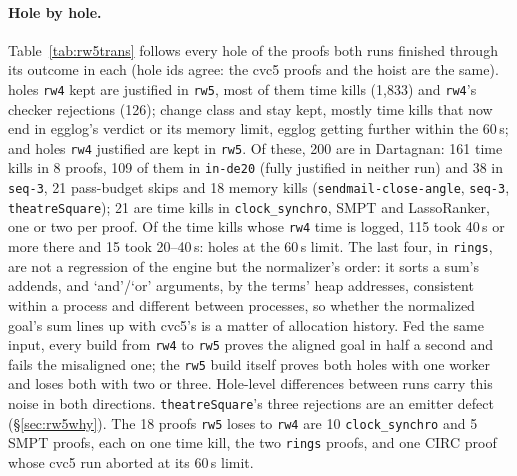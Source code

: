 \documentclass[11pt,a4paper]{article}
\newcommand{\code}[1]{\texttt{#1}}
\begin{document}
\paragraph{Hole by hole.} Table~\ref{tab:rw5trans} follows every hole of
the proofs both runs finished through its outcome in each (hole ids agree:
the cvc5 proofs and the hoist are the same). \rwfivegains{} holes
\code{rw4} kept are justified in \code{rw5}, most of them time kills
(1,833) and \code{rw4}'s checker rejections (126); \rwfiveshifts{} change
class and stay kept, mostly time kills that now end in egglog's verdict or
its memory limit, egglog getting further within the 60\,s; and
\rwfivelosses{} holes \code{rw4} justified are kept in \code{rw5}. Of
these, 200 are in Dartagnan: 161 time kills in 8 proofs, 109 of them in
\code{in-de20} (fully justified in neither run) and 38 in \code{seq-3}, 21 pass-budget
skips and 18 memory kills (\code{sendmail-close-angle}, \code{seq-3},
\code{theatreSquare}); 21 are time kills in \code{clock\_synchro}, SMPT
and LassoRanker, one or two per proof. Of the time kills whose \code{rw4}
time is logged, 115 took 40\,s or more there and 15 took 20--40\,s: holes
at the 60\,s limit. The last four, in \code{rings}, are not a regression
of the engine but the normalizer's order: it sorts a sum's addends, and
`and'/`or' arguments, by the terms' heap addresses, consistent within a
process and different between processes, so whether the normalized goal's
sum lines up with cvc5's is a matter of allocation history. Fed the same
input, every build from \code{rw4} to \code{rw5} proves the aligned goal
in half a second and fails the misaligned one; the \code{rw5} build
itself proves both holes with one worker and loses both with two or
three. Hole-level differences between runs carry this noise in both
directions. \code{theatreSquare}'s three rejections are an emitter defect
(\S\ref{sec:rw5why}). The 18 proofs \code{rw5} loses to \code{rw4} are 10
\code{clock\_synchro} and 5 SMPT proofs, each on one time kill, the two
\code{rings} proofs, and one CIRC proof whose cvc5 run aborted at its
60\,s limit.

\begin{table}[htbp]\centering\footnotesize

\caption{Holes whose outcome differs between \code{rw4} and \code{rw5}, on
  the proofs whose elaboration pass finished in both; transitions of fewer
  than three holes are left out.}\label{tab:rw5trans}
\end{table}
\end{document}
